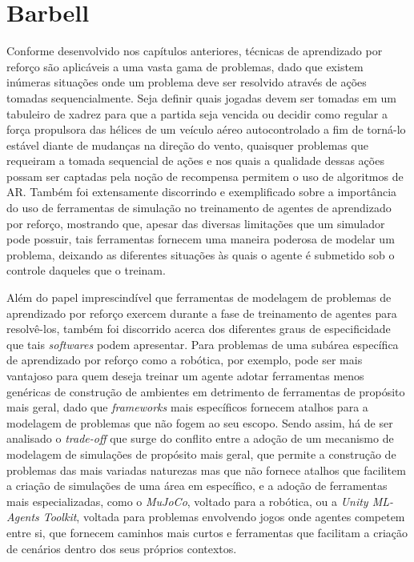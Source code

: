 \documentclass[cic,tc]{iiufrgs}
\begin{document}
\chapter{Barbell}

Conforme desenvolvido nos capítulos anteriores, técnicas de aprendizado por
reforço são aplicáveis a uma vasta gama de problemas, dado que existem inúmeras
situações onde um problema deve ser resolvido através de ações tomadas
sequencialmente. Seja definir quais jogadas devem ser tomadas em um tabuleiro de
xadrez para que a partida seja vencida ou decidir como regular a força propulsora
das hélices de um veículo aéreo autocontrolado a fim de torná-lo estável diante
de mudanças na direção do vento, quaisquer problemas que requeiram a tomada
sequencial de ações e nos quais a qualidade dessas ações possam ser captadas
pela noção de recompensa permitem o uso de algoritmos de AR. Também foi
extensamente discorrindo e exemplificado sobre a importância do uso de
ferramentas de simulação no treinamento de agentes de aprendizado por reforço,
mostrando que, apesar das diversas limitações que um simulador pode possuir,
tais ferramentas fornecem uma maneira poderosa de modelar um problema, deixando
as diferentes situações às quais o agente é submetido sob o controle daqueles
que o treinam.



Além do papel imprescindível que ferramentas de modelagem de problemas de
aprendizado por reforço exercem durante a fase de treinamento de agentes para
resolvê-los, também foi discorrido acerca dos diferentes graus de especificidade
que tais \textit{softwares} podem apresentar. Para problemas de uma subárea
específica de aprendizado por reforço como a robótica, por exemplo, pode ser
mais vantajoso para quem deseja treinar um agente adotar ferramentas menos
genéricas de construção de ambientes em detrimento de ferramentas de propósito
mais geral, dado que \textit{frameworks} mais específicos fornecem atalhos para
a modelagem de problemas que não fogem ao seu escopo. Sendo assim, há de ser
analisado o \textit{trade-off} que surge do conflito entre a adoção de um
mecanismo de modelagem de simulações de propósito mais geral, que permite a
construção de problemas das mais variadas naturezas mas que não fornece atalhos
que facilitem a criação de simulações de uma área em específico, e a adoção de
ferramentas mais especializadas, como o \textit{MuJoCo}, voltado para a
robótica, ou a \textit{Unity ML-Agents Toolkit}, voltada para problemas
envolvendo jogos onde agentes competem entre si, que fornecem caminhos mais
curtos e ferramentas que facilitam a criação de cenários dentro dos seus
próprios contextos.
\end{document}
